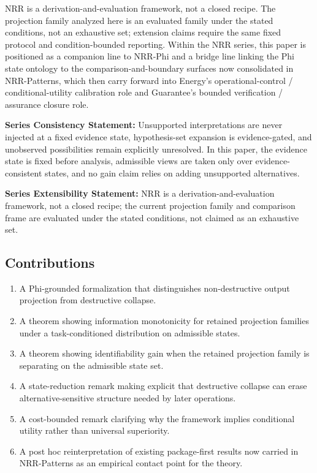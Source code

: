 \documentclass[11pt,a4paper]{article}
\begin{document}
NRR is a derivation-and-evaluation framework, not a closed recipe.
The projection family analyzed here is an evaluated family under the stated conditions, not an exhaustive set; extension claims require the same fixed protocol and condition-bounded reporting.
Within the NRR series, this paper is positioned as a companion line to NRR-Phi and a bridge line linking the Phi state ontology to the comparison-and-boundary surfaces now consolidated in NRR-Patterns, which then carry forward into Energy's operational-control / conditional-utility calibration role and Guarantee's bounded verification / assurance closure role.

\textbf{Series Consistency Statement:}
Unsupported interpretations are never injected at a fixed evidence state, hypothesis-set expansion is evidence-gated, and unobserved possibilities remain explicitly unresolved. In this paper, the evidence state is fixed before analysis, admissible views are taken only over evidence-consistent states, and no gain claim relies on adding unsupported alternatives.

\textbf{Series Extensibility Statement:}
NRR is a derivation-and-evaluation framework, not a closed recipe; the current projection family and comparison frame are evaluated under the stated conditions, not claimed as an exhaustive set.

\subsection{Contributions}

\begin{enumerate}
  \item A Phi-grounded formalization that distinguishes non-destructive output projection from destructive collapse.
  \item A theorem showing information monotonicity for retained projection families under a task-conditioned distribution on admissible states.
  \item A theorem showing identifiability gain when the retained projection family is separating on the admissible state set.
  \item A state-reduction remark making explicit that destructive collapse can erase alternative-sensitive structure needed by later operations.
  \item A cost-bounded remark clarifying why the framework implies conditional utility rather than universal superiority.
  \item A post hoc reinterpretation of existing package-first results now carried in NRR-Patterns \cite{saito2026patterns} as an empirical contact point for the theory.
\end{enumerate}
\end{document}
